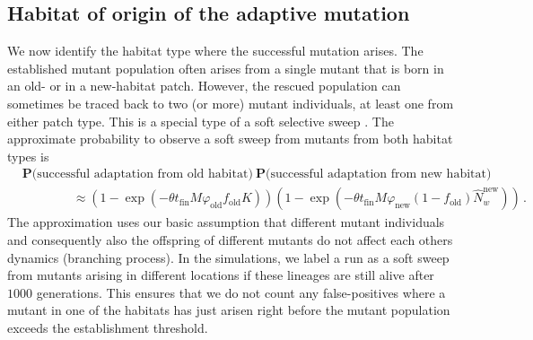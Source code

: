 \documentclass[11pt]{article}
\newcommand{\chg}[1]{\textcolor{change}{#1}}
\begin{document}
\subsection*{Habitat of origin of the adaptive mutation}
We now identify the habitat type where the successful mutation arises. The established mutant population often arises from a single mutant that is born in an old- or in a new-habitat patch. However, the rescued population can sometimes be traced back to two (or more) mutant individuals, \chg{at least} one from either patch type. \chg{This is a special type of a soft selective sweep \citep[see][for a review]{hermisson_2017}. The approximate probability to observe a soft sweep from mutants from both habitat types is 
\begin{equation}\label{eq:origin}
    \begin{aligned}
	&\mathbf{P}\big(\text{successful adaptation from old habitat}\big)\ \mathbf{P}\big(\text{successful adaptation from new habitat}\big) \\
	& \qquad \qquad \approx \left(1 - \exp\left(-\theta t_{\text{fin}} M \varphi_{\text{old}} f_{\text{old}} K\right)\right)\left(1- \exp\left(-\theta t_{\text{fin}} M \varphi_{\text{new}} (1-f_{\text{old}}) \widehat{N}_w^{\text{new}}\right)\right)\, .
	\end{aligned}
\end{equation} 
}
\chg{The approximation uses our basic assumption that different mutant individuals and consequently also the offspring of different mutants do not affect each others dynamics (branching process). In the simulations, we label a run as a soft sweep from mutants arising in different locations if these lineages are still alive after $1000$ generations. This ensures that we do not count any false-positives where a mutant in one of the habitats has just arisen right before the mutant population exceeds the establishment threshold.}
\end{document}
